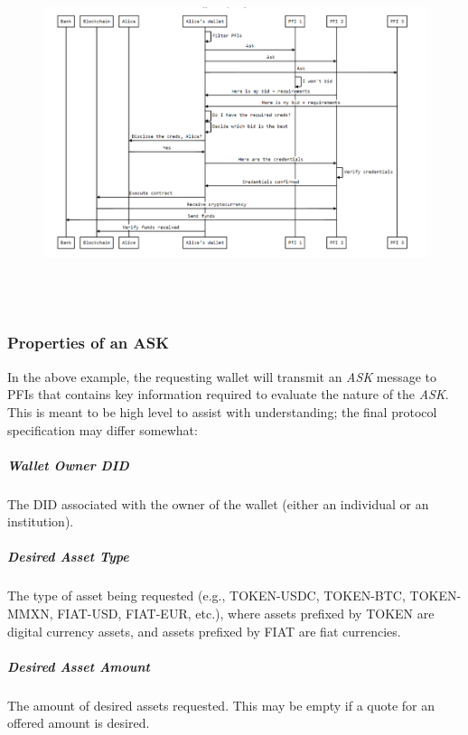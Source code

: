 \documentclass[11pt]{article}
\begin{document}
\vspace{1\baselineskip}
\textcolor[HTML]{3C4043}{\begin{figure}[H]
\includegraphics[width=15.48cm,height=10.29cm]{./diagrams/off-ramp.png}
\end{figure}
}

\vspace{1\baselineskip}
\subsubsection{Properties of an ASK}

In the above example, the requesting wallet will transmit an \textit{ASK }message to PFIs that contains key information required to evaluate the nature of the \textit{ASK}. This is meant to be high level to assist with understanding; the final protocol specification may differ somewhat: \ \ 

\subparagraph{Wallet Owner DID}

The DID associated with the owner of the wallet (either an individual or an institution).

\subparagraph{Desired Asset Type}

The type of asset being requested (e.g., TOKEN-USDC, TOKEN-BTC, TOKEN-MMXN, FIAT-USD, FIAT-EUR, etc.), where assets prefixed by TOKEN are digital currency assets, and assets prefixed by FIAT are fiat currencies.\textit{ }

\subparagraph{Desired Asset Amount}

The amount of desired assets requested. This may be empty if a quote for an offered amount is desired. 
\end{document}
